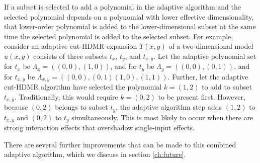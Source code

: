 If a subset is
selected to add a polynomial in the adaptive algorithm and the selected polynomial depends on a polynomial with 
lower effective
dimensionality, that lower-order polynomial is added to the lower-dimensional subset at the same time the
selected polynomial is added to the selected subset.  For example, consider an adaptive cut-HDMR expansion $T(x,y)$ of a
two-dimensional model $u(x,y)$ consists of three subsets $t_x$, $t_y$, and $t_{x,y}$.  Let the adaptive
polynomial set for $t_x$ be $\Lambda_x = ( (0,0),(1,0) )$, and for $t_y$ be $\Lambda_y = ( (0,0),(0,1) )$, and for
$t_{x,y}$ be $\Lambda_{x,y} =( (0,0),(0,1)(1,0),(1,1))$.  Further, let the adaptive cut-HDMR algorithm have
selected the polynomial $k=(1,2)$ to add to subset $t_{x,y}$.  Traditionally, this would require $k=(0,2)$ to
be present first.  However, because $(0,2)$ belongs to subset $t_y$, the adaptive algorithm step adds $(1,2)$
to $t_{x,y}$ and $(0,2)$ to $t_y$ simultaneously.  This is most likely to occur when there are strong
interaction effects that overshadow single-input effects.

There are several further improvements that can be made to this combined adaptive algorithm, which we discuss
in section \ref{ch:future}.
